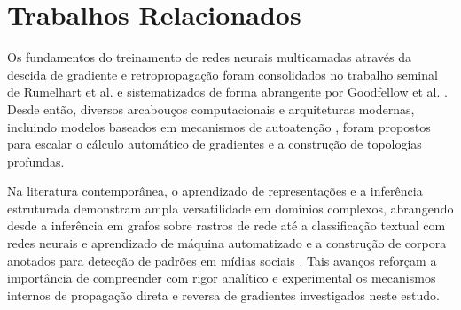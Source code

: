 \section{Trabalhos Relacionados}
\label{sec:trabalhos_relacionados}

Os fundamentos do treinamento de redes neurais multicamadas através da descida de gradiente e retropropagação foram consolidados no trabalho seminal de Rumelhart et al. \cite{rumelhart1986learning} e sistematizados de forma abrangente por Goodfellow et al. \cite{goodfellow2016deep}. Desde então, diversos arcabouços computacionais e arquiteturas modernas, incluindo modelos baseados em mecanismos de autoatenção \cite{vaswani2017attention}, foram propostos para escalar o cálculo automático de gradientes e a construção de topologias profundas.

Na literatura contemporânea, o aprendizado de representações e a inferência estruturada demonstram ampla versatilidade em domínios complexos, abrangendo desde a inferência em grafos sobre rastros de rede \cite{nabeel2020following} até a classificação textual com redes neurais e aprendizado de máquina automatizado \cite{muzakir2025text} e a construção de corpora anotados para detecção de padrões em mídias sociais \cite{alvarezojeda2025precom}. Tais avanços reforçam a importância de compreender com rigor analítico e experimental os mecanismos internos de propagação direta e reversa de gradientes investigados neste estudo.
